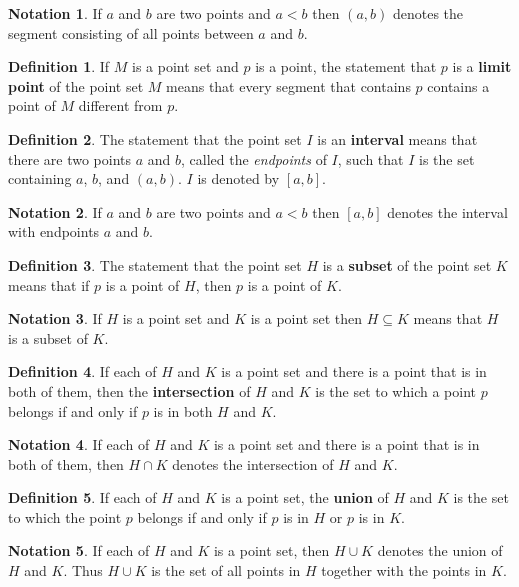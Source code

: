 \documentclass{article}
\theoremstyle{definition}
\newtheorem{definition}{Definition}
\newtheorem{notation}{Notation}
\begin{document}
\begin{notation}
If $a$ and $b$ are two points and $a < b$ then $(a, b)$ denotes the segment consisting of all points between $a$ and $b$.
\end{notation}
\begin{definition}
If $M$ is a point set and $p$ is a point, the statement that $p$ is a \textbf{limit point} of the point set $M$ means that every segment that contains $p$ contains a point of $M$ different from $p$.
\end{definition}

\begin{definition}
The statement that the point set $I$ is an \textbf{interval} means that there are two points $a$ and $b$, called the \textit{endpoints} of $I$, such that $I$ is the set containing $a$, $b$, and $(a, b)$. $I$ is denoted by $[a, b]$.
\end{definition}
\begin{notation}
If $a$ and $b$ are two points and $a < b$ then $[a, b]$ denotes the interval with endpoints $a$ and $b$.
\end{notation}

\begin{definition}
The statement that the point set $H$ is a \textbf{subset} of the point set $K$ means that if $p$ is a point of $H$, then $p$ is a point of $K$. 
\end{definition}
\begin{notation}
If $H$ is a point set and $K$ is a point set then $H \subseteq K$ means that $H$ is a subset of $K$.
\end{notation}

\begin{definition}
If each of $H$ and $K$ is a point set and there is a point that is in both of them, then the \textbf{intersection} of $H$ and $K$ is the set to which a point $p$ belongs if and only if $p$ is in both $H$ and $K$.
\end{definition}
\begin{notation}
If each of $H$ and $K$ is a point set and there is a point that is in both of them, then $H \cap K$ denotes the intersection of $H$ and $K$.
\end{notation}

\begin{definition}
If each of $H$ and $K$ is a point set, the \textbf{union} of $H$ and $K$ is the set to which the point $p$ belongs if and only if $p$ is in $H$ or $p$ is in $K$.
\end{definition}
\begin{notation}
If each of $H$ and $K$ is a point set, then $H \cup K$ denotes the union of $H$ and $K$. Thus $H \cup K$ is the set of all points in $H$ together with the points in $K$.
\end{notation}
\end{document}
